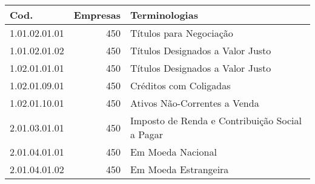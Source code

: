 \begin{table}[ht]
\centering
\begin{tabular}{lrl}
  \hline
Cod. & Empresas & Terminologias \\ 
  \hline
1.01.02.01.01 & 450 & Títulos para Negociação \\ 
  1.01.02.01.02 & 450 & Títulos Designados a Valor Justo \\ 
  1.02.01.01.01 & 450 & Títulos Designados a Valor Justo \\ 
  1.02.01.09.01 & 450 & Créditos com Coligadas \\ 
  1.02.01.10.01 & 450 & Ativos Não-Correntes a Venda \\ 
  2.01.03.01.01 & 450 & Imposto de Renda e Contribuição Social a Pagar \\ 
  2.01.04.01.01 & 450 & Em Moeda Nacional \\ 
  2.01.04.01.02 & 450 & Em Moeda Estrangeira \\ 
   \hline
\end{tabular}
\end{table}
